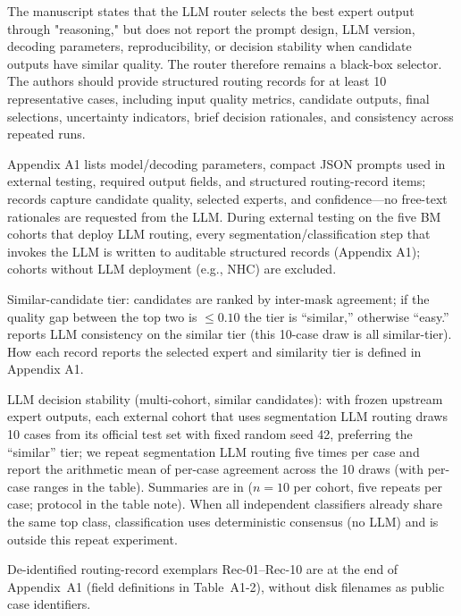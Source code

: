 \begin{reviewercomment}
The manuscript states that the LLM router selects the best expert output through "reasoning," but does not report the prompt design, LLM version, decoding parameters, reproducibility, or decision stability when candidate outputs have similar quality. The router therefore remains a black-box selector. The authors should provide structured routing records for at least 10 representative cases, including input quality metrics, candidate outputs, final selections, uncertainty indicators, brief decision rationales, and consistency across repeated runs.
\end{reviewercomment}
\begin{authorresponse}
Appendix A1 lists model/decoding parameters, compact JSON prompts used in external testing, required output fields, and structured routing-record items; records capture candidate quality, selected experts, and confidence---no free-text rationales are requested from the LLM. During external testing on the five BM cohorts that deploy LLM routing, every segmentation/classification step that invokes the LLM is written to auditable structured records (Appendix A1); cohorts without LLM deployment (e.g., NHC) are excluded.\par
Similar-candidate tier: candidates are ranked by inter-mask agreement; if the quality gap between the top two is $\leq 0.10$ the tier is ``similar,'' otherwise ``easy.''  reports LLM consistency on the similar tier (this 10-case draw is all similar-tier). How each record reports the selected expert and similarity tier is defined in Appendix A1.\par
LLM decision stability (multi-cohort, similar candidates): with frozen upstream expert outputs, each external cohort that uses segmentation LLM routing draws 10 cases from its official test set with fixed random seed 42, preferring the ``similar'' tier; we repeat segmentation LLM routing five times per case and report the arithmetic mean of per-case agreement across the 10 draws (with per-case ranges in the table). Summaries are in  ($n{=}10$ per cohort, five repeats per case; protocol in the table note). When all independent classifiers already share the same top class, classification uses deterministic consensus (no LLM) and is outside this repeat experiment.\par
De-identified routing-record exemplars Rec-01--Rec-10 are at the end of Appendix~A1 (field definitions in Table~A1-2), without disk filenames as public case identifiers.\par
\par
\end{authorresponse}

